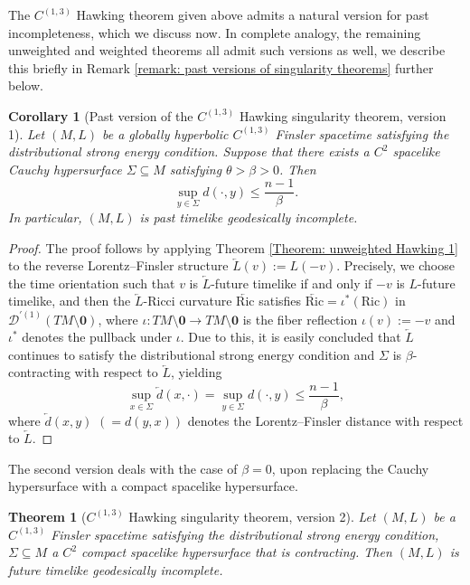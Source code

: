 \documentclass[a4paper,11pt]{article}
\numberwithin{equation}{section}
\theoremstyle{definition}
\theoremstyle{plain}
\newtheorem{Theorem}[Definition]{Theorem}
\newtheorem{Corollary}[Definition]{Corollary}
\newcommand{\Ric}{\mathrm{Ric}}
\begin{document}
The $C^{(1,3)}$ Hawking theorem given above admits a natural version for past incompleteness, which we discuss now.
In complete analogy, the remaining unweighted and weighted theorems all admit such versions as well, we describe this briefly in Remark \ref{remark: past versions of singularity theorems} further below.

\begin{Corollary}[Past version of the $C^{(1,3)}$ Hawking singularity theorem, version 1]
\label{cr:past-sing}
Let $(M,L)$ be a globally hyperbolic $C^{(1,3)}$ Finsler spacetime satisfying the distributional strong energy condition.
Suppose that there exists a $C^2$ spacelike Cauchy hypersurface $\Sigma \subseteq M$ satisfying $\theta > \beta > 0$. 
Then 
\begin{equation*}
    \sup_{y \in \Sigma} d(\cdot,y) \leq \frac{n-1}{\beta}.
\end{equation*}
In particular, $(M,L)$ is past timelike geodesically incomplete.
\end{Corollary}

\begin{proof}
    The proof follows by applying Theorem \ref{Theorem: unweighted Hawking 1} to the reverse Lorentz--Finsler structure $\overleftarrow{L}(v):=L(-v)$.
    Precisely, we choose the time orientation such that $v$ is $\overleftarrow{L}$-future timelike if and only if $-v$ is $L$-future timelike, and then the $\overleftarrow{L}$-Ricci curvature $\overleftarrow{\Ric}$ satisfies $\overleftarrow{\Ric} =\iota^*(\Ric)$ in $\mathcal{D}^{'(1)}(TM \setminus \mathbf 0)$, where $\iota:TM \setminus \mathbf 0 \to TM \setminus \mathbf 0$ is the fiber reflection $\iota(v):=-v$ and $\iota^*$ denotes the pullback under $\iota$. Due to this, it is easily concluded that $\overleftarrow{L}$ continues to satisfy the distributional strong energy condition and $\Sigma$ is $\beta$-contracting with respect to $\overleftarrow{L}$, yielding
    \[
    \sup_{x \in \Sigma} \overleftarrow{d}(x,\cdot)
    =\sup_{y \in \Sigma}d(\cdot,y)
    \le \frac{n-1}{\beta},
    \]
    where $\overleftarrow{d}(x,y)$ $(=d(y,x))$ denotes the Lorentz--Finsler distance with respect to $\overleftarrow{L}$.
\end{proof}

The second version deals with the case of $\beta=0$, upon replacing the Cauchy hypersurface with a compact spacelike hypersurface.

\begin{Theorem}[$C^{(1,3)}$ Hawking singularity theorem, version 2]
\label{Theorem: Hawking version 2}
Let $(M,L)$ be a $C^{(1,3)}$ Finsler spacetime satisfying the distributional strong energy condition, $\Sigma \subseteq M$ a $C^2$ compact spacelike hypersurface that is contracting. 
Then $(M,L)$ is future timelike geodesically incomplete.
\end{Theorem}
\end{document}
